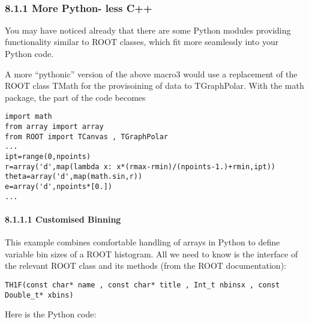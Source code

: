 \documentclass{article}
\begin{document}
    \begin{center}
    \end{center}
    { \hspace*{\fill} \\}
    
    \subsubsection{8.1.1 More Python- less C++}\label{more-python--less-c}

You may have noticed already that there are some Python modules
providing functionality similar to ROOT classes, which fit more
seamlessly into your Python code.

A more ``pythonic'' version of the above macro3 would use a replacement
of the ROOT class TMath for the provisoining of data to TGraphPolar.
With the math package, the part of the code becomes

\begin{verbatim}
import math
from array import array
from ROOT import TCanvas , TGraphPolar
...
ipt=range(0,npoints)
r=array('d',map(lambda x: x*(rmax-rmin)/(npoints-1.)+rmin,ipt))
theta=array('d',map(math.sin,r))
e=array('d',npoints*[0.])
...
\end{verbatim}

\paragraph{8.1.1.1 Customised Binning}\label{customised-binning}

This example combines comfortable handling of arrays in Python to define
variable bin sizes of a ROOT histogram. All we need to know is the
interface of the relevant ROOT class and its methods (from the ROOT
documentation):

\begin{verbatim}
TH1F(const char* name , const char* title , Int_t nbinsx , const Double_t* xbins)
\end{verbatim}

Here is the Python code:
\end{document}
